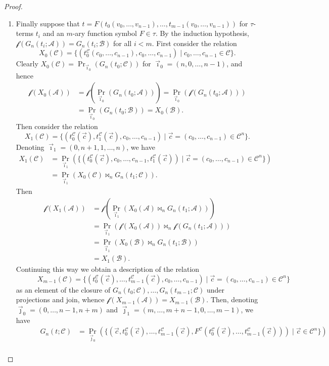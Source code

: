 \documentclass[10pt,a4paper]{amsart}
\newcommand{\A}{\mathcal{A}}
\newcommand{\B}{\mathcal{B}}
\newcommand{\C}{\mathcal{C}}
\newcommand{\f}{\mathcal{f}}
\begin{document}
\begin{proof}
\begin{enumerate}
        \item Finally suppose that $t = F(t_0(v_0,\dots,v_{n-1}),\dots,t_{m-1}(v_0,\dots,v_{n-1}))$ for $\tau$-terms $t_i$ and an $m$-ary function symbol $F\in\tau$. By the induction hypothesis, $\f(G_n(t_i;\A)) = G_n(t_i;\B)$ for all $i<m$. First consider the relation
        \[
            X_0(\C) = \{ (t_0^\C(c_0,\dots,c_{n-1}),c_0,\dots,c_{n-1}) \mid c_0,\dots,c_{n-1}\in\C \}.
        \]
        Clearly $X_0(\C) = \Pr_{\vec\imath_0}(G_n(t_0;\C))$ for $\vec\imath_0 = (n,0,\dots,n-1)$, and hence
        \begin{align*}
            \f(X_0(\A)) &= \f(\Pr_{\vec\imath_0}(G_n(t_0;\A))) = \Pr_{\vec\imath_0}(\f(G_n(t_0;\A))) \\
            &= \Pr_{\vec\imath_0}(G_n(t_0;\B)) = X_0(\B).
        \end{align*}
        Then consider the relation
        \[
            X_1(\C) = \{ (t_0^\C(\vec c),t_1^\C(\vec c),c_0,\dots,c_{n-1}) \mid \vec c = (c_0,\dots,c_{n-1})\in\C^n \}.
        \]
        Denoting $\vec\imath_1 = (0,n+1,1,\dots,n)$, we have
        \begin{align*}
            X_1(\C) &= \Pr_{\vec\imath_1}( \{ (t_0^\C(\vec c),c_0,\dots,c_{n-1},t_1^\C(\vec c)) \mid \vec c = (c_0,\dots,c_{n-1})\in\C^n \} ) \\
            &= \Pr_{\vec\imath_1}( X_0(\C) \bowtie_n G_n(t_1;\C) ).
        \end{align*}
        Then
        \begin{align*}
            \f(X_1(\A)) &= \f(\Pr_{\vec\imath_1}( X_0(\A) \bowtie_n G_n(t_1;\A) )) \\
            &= \Pr_{\vec\imath_1}( \f(X_0(\A)) \bowtie_n \f(G_n(t_1;\A)) ) \\
            &= \Pr_{\vec\imath_1}( X_0(\B) \bowtie_n G_n(t_1;\B) ) \\
            &= X_1(\B).
        \end{align*}
        Continuing this way we obtain a description of the relation
        \[
            \hspace{3em} X_{m-1}(\C) = \{ (t_0^\C(\vec c),\dots,t_{m-1}^\C(\vec c),c_0,\dots,c_{n-1}) \mid \vec c = (c_0,\dots,c_{n-1})\in\C^n \}
        \]
        as an element of the closure of $G_n(t_0;\C),\dots,G_n(t_{m-1};\C)$ under projections and join, whence $\f(X_{m-1}(\A)) = X_{m-1}(\B)$. Then, denoting $\vec\jmath_0 = (0,\dots,n-1,n+m)$ and $\vec\jmath_1 = (m,\dots,m+n-1,0,\dots,m-1)$, we have
        \begin{align*}
            \hspace{3em} G_n(t;\C) &= \Pr_{\vec\jmath_0}\left( \{ (\vec c,t_0^\C(\vec c),\dots,t_{m-1}^\C(\vec c),F^\C(t_0^\C(\vec c),\dots,t_{m-1}^\C(\vec c))) \mid \vec c\in\C^n \} \right) \\

\end{align*}
\end{enumerate}
\end{proof}
\end{document}
